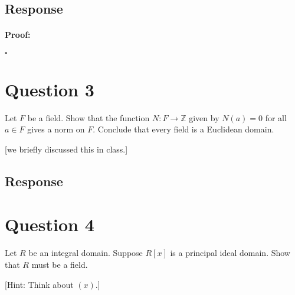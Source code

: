 \documentclass [12pt] {article}
\newcommand{\Z}{\mathbb{Z}}
\newenvironment{proof}{\paragraph{Proof:}}{\hfill$\square$}
\begin{document}
\subsection*{Response}
\begin{proof}
\end{proof}
\newpage

\section*{Question 3}
Let $F$ be a field. Show that the function $N:F\to \Z$ given by $N(a)=0$ for all $a\in F$ gives a
norm on $F$. Conclude that every field is a Euclidean domain.

[we briefly discussed this in class.]
\subsection*{Response}
\newpage

\section*{Question 4}
Let $R$ be an integral domain. Suppose $R[x]$ is a principal ideal domain. Show that $R$ must be a
field.

[Hint: Think about $(x)$.]
\end{document}
